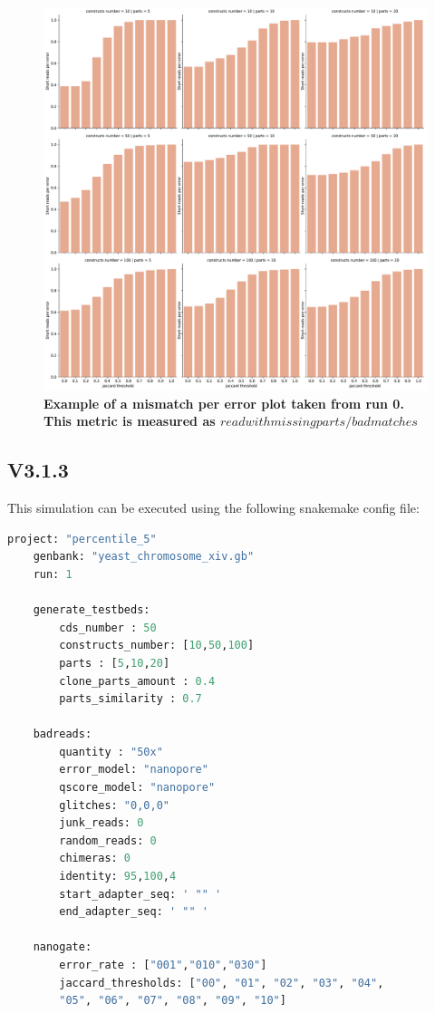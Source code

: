 \documentclass[11pt, a4paper]{article}
\begin{document}
\begin{figure}[ht]
    \begin{center}
    \includegraphics[width=1\textwidth]{../results/images_notebook/v_310/001_short_reads_per_error.pdf}
    \end{center}
    \caption{{\bf Example of a mismatch per error plot taken from run 0. This metric is measured as $read with missing parts/bad matches$ }}
   \label{fig:v_310_shortread_per_error}
\end{figure}

\clearpage

\subsection{V3.1.3 }
This simulation can be executed using the following snakemake config file:
  \begin{lstlisting}[language=Python]
    project: "percentile_5"
    genbank: "yeast_chromosome_xiv.gb"
    run: 1

    generate_testbeds:
        cds_number : 50
        constructs_number: [10,50,100]
        parts : [5,10,20]
        clone_parts_amount : 0.4
        parts_similarity : 0.7

    badreads:
        quantity : "50x"
        error_model: "nanopore"
        qscore_model: "nanopore"
        glitches: "0,0,0"
        junk_reads: 0
        random_reads: 0
        chimeras: 0
        identity: 95,100,4
        start_adapter_seq: ' "" '
        end_adapter_seq: ' "" '

    nanogate:
        error_rate : ["001","010","030"]
        jaccard_thresholds: ["00", "01", "02", "03", "04", 
        "05", "06", "07", "08", "09", "10"]
\end{lstlisting}
\end{document}
